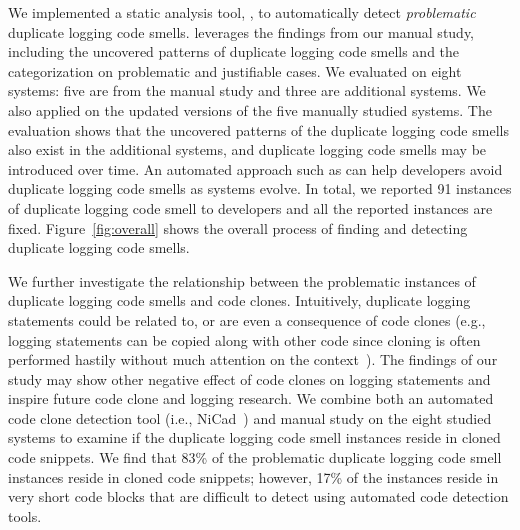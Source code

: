 We implemented a static analysis tool, \tool, to automatically detect {\em problematic} duplicate logging code smells. \toolS leverages the findings from our manual study, including the uncovered patterns of duplicate logging code smells and the categorization on problematic and justifiable cases.
We evaluated \toolS on eight systems: five are from the manual study and three are additional systems. We also applied \toolS on the updated versions of the five manually studied systems. The evaluation shows that the uncovered patterns of the duplicate logging code smells also exist in the additional systems, and duplicate logging code smells may be introduced over time. An automated approach such as \toolS can help developers avoid duplicate logging code smells as systems evolve.
In total, we reported 91 instances of duplicate logging code smell to developers and all the reported instances are fixed. %
Figure~\ref{fig:overall} shows the overall process of finding and detecting duplicate logging code smells.

We further investigate the relationship between the problematic instances of duplicate logging code smells and code clones. Intuitively, duplicate logging statements could be related to, or are even a consequence of code clones (e.g., logging statements can be copied along with other code since cloning is often performed hastily without much attention on the context~\cite{5463343}). 
The findings of our study may show other negative effect of code clones on logging statements and inspire future code clone and logging research. 
We combine both an automated code clone detection tool (i.e., NiCad~\cite{nicad}) and manual study on the eight studied systems to examine if the duplicate logging code smell instances reside in cloned code snippets. We find that 83\% of the problematic duplicate logging code smell instances reside in cloned code snippets; however, 17\% of the instances reside in very short code blocks that are difficult to detect using automated code detection tools. %


